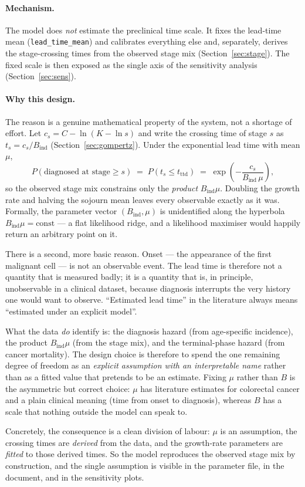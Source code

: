 \documentclass[12pt,a4paper]{article}
\newcommand{\id}[1]{\texttt{#1}}
\newcommand{\mech}[1]{\paragraph{Mechanism.} #1}
\newcommand{\why}[1]{\paragraph{Why this design.} #1}
\begin{document}
\mech{The model does \emph{not} estimate the preclinical time scale. It fixes the lead-time mean
(\id{lead\_time\_mean}) and calibrates everything else and, separately, derives the stage-crossing times
from the observed stage mix (Section~\ref{sec:stage}). The fixed scale is then exposed as the single axis
of the sensitivity analysis (Section~\ref{sec:sens}).}

\why{The reason is a genuine mathematical property of the system, not a shortage of effort. Let
$c_s = C - \ln(K - \ln s)$ and write the crossing time of stage $s$ as $t_s = c_s / B_{\text{ind}}$
(Section~\ref{sec:gompertz}). Under the exponential lead time with mean $\mu$,
\[
P(\text{diagnosed at stage} \ge s) \;=\; P(t_s \le t_{\text{ttd}}) \;=\; \exp\!\left(-\frac{c_s}{B_{\text{ind}}\,\mu}\right),
\]
so the observed stage mix constrains only the \emph{product} $B_{\text{ind}}\mu$. Doubling the growth rate
and halving the sojourn mean leaves every observable exactly as it was. Formally, the parameter vector
$(B_{\text{ind}}, \mu)$ is unidentified along the hyperbola $B_{\text{ind}}\mu = \text{const}$ --- a flat
likelihood ridge, and a likelihood maximiser would happily return an arbitrary point on it.

There is a second, more basic reason. Onset --- the appearance of the first malignant cell --- is not an
observable event. The lead time is therefore not a quantity that is measured badly; it is a quantity that
is, in principle, unobservable in a clinical dataset, because diagnosis interrupts the very history one
would want to observe. ``Estimated lead time'' in the literature always means ``estimated under an
explicit model''.

What the data \emph{do} identify is: the diagnosis hazard (from age-specific incidence), the product
$B_{\text{ind}}\mu$ (from the stage mix), and the terminal-phase hazard (from cancer mortality). The design
choice is therefore to spend the one remaining degree of freedom as an \emph{explicit assumption with an
interpretable name} rather than as a fitted value that pretends to be an estimate. Fixing $\mu$ rather than
$B$ is the asymmetric but correct choice: $\mu$ has literature estimates for colorectal cancer and a plain
clinical meaning (time from onset to diagnosis), whereas $B$ has a scale that nothing outside the model
can speak to.

Concretely, the consequence is a clean division of labour: $\mu$ is an assumption, the crossing times are
\emph{derived} from the data, and the growth-rate parameters are \emph{fitted} to those derived times. So
the model reproduces the observed stage mix by construction, and the single assumption is visible in the
parameter file, in the document, and in the sensitivity plots.}
\end{document}
